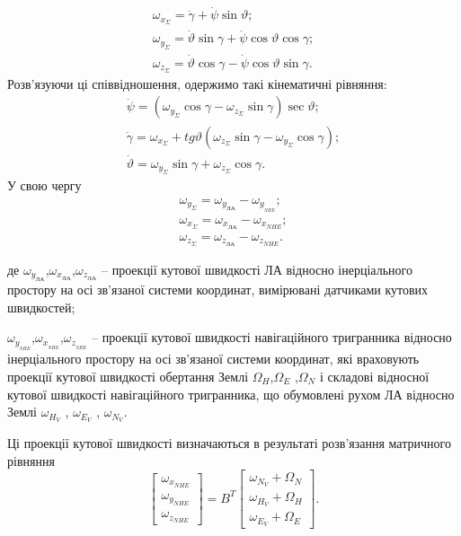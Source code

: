 \[\begin{array}{l} 
{\omega_{x_{\Sigma }} =\dot{\gamma }+\dot{\psi }\sin \vartheta ;} \\ 
{\omega_{y_{\Sigma }} =\dot{\vartheta }\sin \gamma +\dot{\psi}\cos \vartheta\cos \gamma ;} \\ 
{\omega_{z_{\Sigma }} =\dot{\vartheta }\cos \gamma -\dot{\psi}\cos \vartheta \sin \gamma .} 
\end{array}\] 
Розв'язуючи ці співвідношення, одержимо такі кінематичні рівняння:
\[\begin{array}{l} 
{\dot{\psi }=(\omega_{y_{\Sigma }} \cos \gamma -\omega_{z_{\Sigma }} \sin \gamma)\sec \vartheta ;} \\ 
{\dot{\gamma }=\omega_{x_{\Sigma }} +tg\vartheta (\omega_{z_{\Sigma }} \sin \gamma -\omega_{y_{\Sigma }} \cos \gamma );} \\ 
{\dot{\vartheta }=\omega_{y_{\Sigma }} \sin \gamma +\omega_{z_{\Sigma }} \cos \gamma.} 
\end{array}\] 
У свою чергу 
\[ \begin{array}{l} 
  {\omega_{y_{\Sigma }} =\omega_{y_{\text{ЛА}}} -\omega_{y_{_{NHE}}};} \\ 
  {\omega_{x_{\Sigma }} =\omega_{x_{\text{ЛА}}}  -\omega_{x_{NHE}} ;} \\ 
  {\omega_{z_{\Sigma }} =\omega_{z_{\text{ЛА}}}  -\omega_{z_{NHE}}.} \end{array}\] 
\begin{ESKDexplanation}
\item де $\omega_{y_{\text{ЛА}}}$,$\omega_{x_{\text{ЛА}}}$,$\omega_{z_{\text{ЛА}}}$ -- проекції 
кутової швидкості ЛА відносно інерціального простору на осі зв'язаної системи координат, 
вимірювані датчиками кутових швидкостей;
\item $\omega_{y_{_{NHE}}}$,$\omega_{x_{_{NHE}}}$,$\omega_{z_{_{NHE}}}$  -- проекції кутової швидкості навігаційного тригранника 
відносно інерціального простору на осі зв'язаної системи координат, які враховують 
проекції кутової швидкості обертання Землі  $\Omega_{H}$,$\Omega_{E}$ ,$\Omega_{N}$
і складові відносної кутової швидкості навігаційного тригранника, 
що обумовлені рухом ЛА відносно Землі $\omega_{H_{V}}$ , $\omega_{E_{V}}$ ,
$\omega_{N_{V}} $. 
\end{ESKDexplanation}
Ці проекції кутової швидкості визначаються в результаті 
розв'язання матричного рівняння 
\[\left
[\begin{array}{c} {\omega_{x_{NHE}}} \\ 
{\omega_{y_{NHE}}} \\ 
{\omega_{z_{NHE}}} 
\end{array}\right]
=B^{T} 
\left[\begin{array}{c} {\omega_{N_{V} 
} +\Omega_{N}} \\ 
{\omega_{H_{V}} +\Omega_{H}} \\ 
{\omega_{E_{V}} +\Omega_{E}} 
\end{array}\right] .\] 
